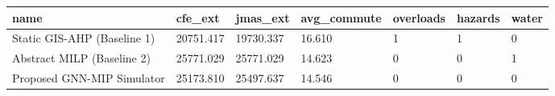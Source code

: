 \begin{tabular}{lllllll}
\hline
name & cfe_ext & jmas_ext & avg_commute & overloads & hazards & water \\
\hline
Static GIS-AHP (Baseline 1) & 20751.417 & 19730.337 & 16.610 & 1 & 1 & 0 \\
Abstract MILP (Baseline 2) & 25771.029 & 25771.029 & 14.623 & 0 & 0 & 1 \\
Proposed GNN-MIP Simulator & 25173.810 & 25497.637 & 14.546 & 0 & 0 & 0 \\
\hline
\end{tabular}
